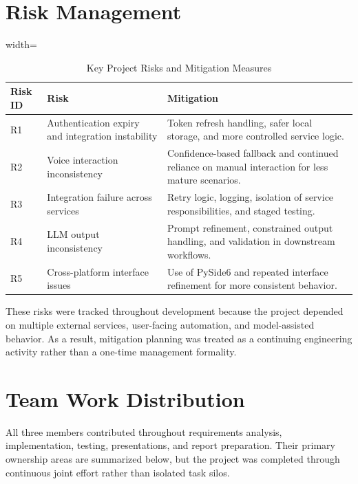 \section{Risk Management}
\begin{table}[!htbp]
\centering
\small
\renewcommand{\arraystretch}{1.15}
\setlength{\tabcolsep}{5pt}
\begin{adjustbox}{width=\textwidth}
\begin{tabular}{|>{\raggedright\arraybackslash}p{2cm}|>{\raggedright\arraybackslash}p{5cm}|>{\raggedright\arraybackslash}p{6cm}|}
\hline
\textbf{Risk ID} & \textbf{Risk} & \textbf{Mitigation} \\ \hline
R1 & Authentication expiry and integration instability & Token refresh handling, safer local storage, and more controlled service logic. \\ \hline
R2 & Voice interaction inconsistency & Confidence-based fallback and continued reliance on manual interaction for less mature scenarios. \\ \hline
R3 & Integration failure across services & Retry logic, logging, isolation of service responsibilities, and staged testing. \\ \hline
R4 & LLM output inconsistency & Prompt refinement, constrained output handling, and validation in downstream workflows. \\ \hline
R5 & Cross-platform interface issues & Use of PySide6 and repeated interface refinement for more consistent behavior. \\ \hline
\end{tabular}
\end{adjustbox}
\caption{Key Project Risks and Mitigation Measures}
\end{table}

These risks were tracked throughout development because the project depended on multiple external services, user-facing automation, and model-assisted behavior. As a result, mitigation planning was treated as a continuing engineering activity rather than a one-time management formality.

\section{Team Work Distribution}
All three members contributed throughout requirements analysis, implementation, testing, presentations, and report preparation. Their primary ownership areas are summarized below, but the project was completed through continuous joint effort rather than isolated task silos.

